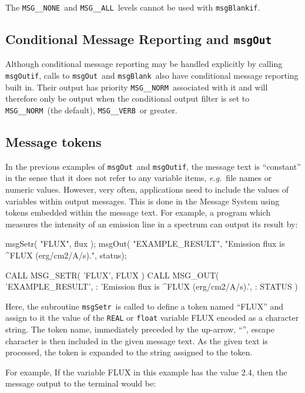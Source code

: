 \documentclass[twoside,11pt]{starlink}
\providecommand{\func}[1]{\texttt{#1}}
\providecommand{\const}[1]{\texttt{#1}}
\providecommand{\msgnone}{\const{MSG\_\_NONE}}
\providecommand{\msgall}{\const{MSG\_\_ALL}}
\providecommand{\msgnorm}{\const{MSG\_\_NORM}}
\providecommand{\msgverb}{\const{MSG\_\_VERB}}
\providecommand{\msgblank}{\func{msgBlank}}
\providecommand{\msgblankif}{\func{msgBlankif}}
\providecommand{\msgout}{\func{msgOut}}
\providecommand{\msgoutif}{\func{msgOutif}}
\providecommand{\msgsetr}{\func{msgSetr}}
\begin{document}
The \msgnone\ and \msgall\ levels cannot be used with \msgblankif.

\subsection{Conditional Message Reporting and \msgout}

Although conditional message reporting may be handled explicitly by calling
\msgoutif, calls to \msgout\ and \msgblank\ also have conditional message
reporting built in.
Their output has priority \msgnorm\ associated with it and will therefore
only be output when the conditional output filter is set to \msgnorm\ (the
default), \msgverb\ or greater.

\subsection{Message tokens}
In the previous examples of \msgout\ and \msgoutif, the message text is
``constant'' in the sense that it does not refer to any variable items,
\textit{e.g.}\ file names or numeric values.
However, very often, applications need to include the values of
variables within output messages.
This is done in the Message System using tokens embedded within the message
text.
For example, a program which measures the intensity of an emission line in
a spectrum can output its result by:

\begin {small}
\begin{terminalv}
      msgSetr( "FLUX", flux );
      msgOut( "EXAMPLE_RESULT",
              "Emission flux is ^FLUX (erg/cm2/A/s).", status);

      CALL MSG_SETR( 'FLUX', FLUX )
      CALL MSG_OUT( 'EXAMPLE_RESULT',
     :             'Emission flux is ^FLUX (erg/cm2/A/s).',
     :             STATUS )
\end{terminalv}
\end {small}

Here, the subroutine \msgsetr\ is called to define a token named ``FLUX''
and assign to it the value of the \texttt{REAL} or \texttt{float} variable FLUX encoded as a character
string.
The token name, immediately preceded by the up-arrow, ``\wedge'', escape
character is then included in the given message text.
As the given text is processed, the token is expanded to the string assigned to
the token.

For example, If the variable FLUX in this example has the value 2.4, then
the message output to the terminal would be:
\end{document}
